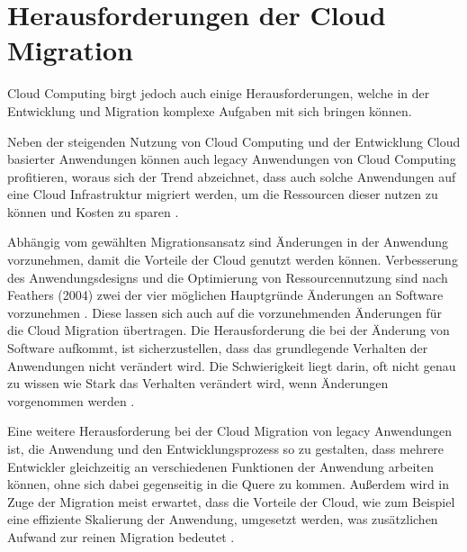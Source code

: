 \section{Herausforderungen der Cloud Migration}


Cloud Computing birgt jedoch auch einige Herausforderungen, welche in der Entwicklung und Migration komplexe Aufgaben mit sich bringen können.

Neben der steigenden Nutzung von Cloud Computing und der Entwicklung Cloud basierter Anwendungen können auch legacy Anwendungen von Cloud Computing profitieren, woraus sich der Trend abzeichnet, dass auch solche Anwendungen auf eine Cloud Infrastruktur migriert werden, um die Ressourcen dieser nutzen zu können und Kosten zu sparen \cite[Vgl.][S. 31]{Maenhaut2016}.

Abhängig vom gewählten Migrationsansatz sind Änderungen in der Anwendung vorzunehmen, damit die Vorteile der Cloud genutzt werden können. Verbesserung des Anwendungsdesigns und die Optimierung von Ressourcennutzung sind nach Feathers (2004) zwei der vier möglichen Hauptgründe Änderungen an Software vorzunehmen \cite[Vgl.][S. 3]{Feathers2004}. Diese lassen sich auch auf die vorzunehmenden Änderungen für die Cloud Migration übertragen. Die Herausforderung die bei der Änderung von Software aufkommt, ist sicherzustellen, dass das grundlegende Verhalten der Anwendungen nicht verändert wird. Die Schwierigkeit liegt darin, oft nicht genau zu wissen wie Stark das Verhalten verändert wird, wenn Änderungen vorgenommen werden \cite[Vgl.][S. 7]{Feathers2004}. 

Eine weitere Herausforderung bei der Cloud Migration von legacy Anwendungen ist, die Anwendung und den Entwicklungsprozess so zu gestalten, dass mehrere Entwickler gleichzeitig an verschiedenen Funktionen der Anwendung arbeiten können, ohne sich dabei gegenseitig in die Quere zu kommen. Außerdem wird in Zuge der Migration meist erwartet, dass die Vorteile der Cloud, wie zum Beispiel eine effiziente Skalierung der Anwendung, umgesetzt werden, was zusätzlichen Aufwand zur reinen Migration bedeutet \cite[Vgl.][]{Ibryam2021}.
\pagebreak